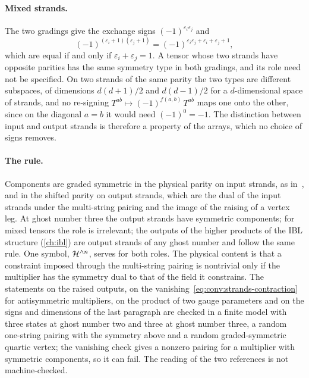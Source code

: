 \paragraph{Mixed strands.}
The two gradings give the exchange signs $(-1)^{\varepsilon_i \varepsilon_j}$ and
\begin{equation}
  (-1)^{(\varepsilon_i + 1) (\varepsilon_j + 1)}
    = (-1)^{\varepsilon_i \varepsilon_j + \varepsilon_i + \varepsilon_j + 1},
\end{equation}
which are equal if and only if $\varepsilon_i + \varepsilon_j = 1$.
A tensor whose two strands have opposite parities has the same symmetry type in both gradings, and its role need not be specified.
On two strands of the same parity the two types are different subspaces, of dimensions $d (d + 1) / 2$ and $d (d - 1) / 2$ for a $d$-dimensional space of strands, and no re-signing $T^{ab} \mapsto (-1)^{f(a,b)} \, T^{ab}$ maps one onto the other, since on the diagonal $a = b$ it would need $(-1)^0 = -1$.
The distinction between input and output strands is therefore a property of the arrays, which no choice of signs removes.

\paragraph{The rule.}
Components are graded symmetric in the physical parity on input strands, as in~\cite{Erler:2014:NSNSSectorClosed,Muenster:2012:HomotopyAlgebrasString-kn}, and in the shifted parity on output strands, which are the dual of the input strands under the multi-string pairing and the image of the raising of a vertex leg.
At ghost number three the output strands have symmetric components; for mixed tensors the role is irrelevant; the outputs of the higher products of the IBL structure (\cref{ch:ibl}) are output strands of any ghost number and follow the same rule.
One symbol, $\mathcal{H}^{\wedge n}$, serves for both roles.
The physical content is that a constraint imposed through the multi-string pairing is nontrivial only if the multiplier has the symmetry dual to that of the field it constrains.
The statements on the raised outputs, on the vanishing~\eqref{eq:conv:strands-contraction} for antisymmetric multipliers, on the product of two gauge parameters and on the signs and dimensions of the last paragraph are checked in a finite model with three states at ghost number two and three at ghost number three, a random one-string pairing with the symmetry above and a random graded-symmetric quartic vertex; the vanishing check gives a nonzero pairing for a multiplier with symmetric components, so it can fail.
The reading of the two references is not machine-checked.
